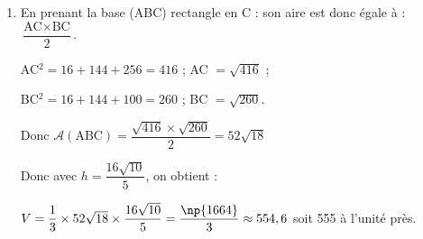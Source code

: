 \begin{enumerate}
\begin{enumerate}
		I appartient au plan (ABC) et appartient à $\Delta$, ses coordonnées $(x~;~y~;~z)$ vérifient donc l'équation du plan (ABC) et les équations paramétriques de $\Delta$ soit le système :
		
$\left\{\begin{array}{l c l}
x &=&12 + 3t\\
y &=&t\\
z &=&0t\\
3x + y - 4&=&0
\end{array}\right.$

En remplaçant dans la dernière équation $x$ et $y$ par leurs valeurs en fonction de $t$ on obtient $3(12 + 3t) + t - 4 = 0 \iff 36 + 9t + t - 4 = 0 \iff 10t + 32 = 0$

$\iff 10t = - 32 \iff t = - \dfrac{32}{10} = - \dfrac{16}{5}$.

En reportant cette valeur dans les deux premières équations de $\Delta$, on obtient :

$x = 12 -3 \times \dfrac{16}{5} = \dfrac{60}{5} - \dfrac{48}{5} = \dfrac{12}{5}$ ;
$y = - \dfrac{16}{5}$ et $z = 0$.

I$\left(\dfrac{12}{5}~;~- \dfrac{16}{5}~;0\right)$.

On calcule DI$^2 = \left(\dfrac{12}{5} - 12 \right)^2 + \left(- \dfrac{16}{5} - 0 \right)^2 + 0^2 = \left(-\dfrac{48}{5}\right)^2 + \left(- \dfrac{16}{5}\right)^2 = \dfrac{\np{2304}}{25} + \dfrac{256}{25} = \dfrac{\np{2560}}{25} = \dfrac{256 \times 10}{25}$.

Finalement DI $= \sqrt{\dfrac{256 \times 10}{25}} = \dfrac{16 \sqrt{10}}{5}$.
	\end{enumerate}
\item 





En prenant la base (ABC) rectangle en C : son aire est donc égale à :
$\dfrac{\text{AC} \times \text{BC}}{2}$.

AC$^2 = 16 + 144  + 256 = 416$ ; AC $ = \sqrt{416}$ ;

BC$^2 = 16 + 144 + 100 = 260$ ; BC $ = \sqrt{260}$.

Donc $\mathcal{A}(\text{ABC}) = \dfrac{\sqrt{416} \times \sqrt{260}}{2} = 52\sqrt{18}$

Donc avec $h = \dfrac{16 \sqrt{10}}{5}$, on obtient :

$V = \dfrac13 \times 52\sqrt{18} \times \dfrac{16 \sqrt{10}}{5} = \dfrac{\np{1664}}{3} \approx 554,6$ soit 555 à l'unité près.
\end{enumerate}

\bigskip
